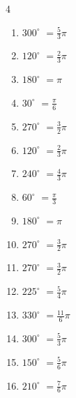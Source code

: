 \begin{multicols}{4}
\begin{enumerate}
  \itemsep=3pt
  \item $\displaystyle 300^{\circ}$
        $\displaystyle =\frac{5}{3}\pi$

  \item $\displaystyle 120^{\circ}$
        $\displaystyle =\frac{2}{3}\pi$

  \item $\displaystyle 180^{\circ}$
        $\displaystyle =\pi$

  \item $\displaystyle 30^{\circ}$
        $\displaystyle =\frac{\pi}{6}$

  \item $\displaystyle 270^{\circ}$
        $\displaystyle =\frac{3}{2}\pi$

  \item $\displaystyle 120^{\circ}$
        $\displaystyle =\frac{2}{3}\pi$

  \item $\displaystyle 240^{\circ}$
        $\displaystyle =\frac{4}{3}\pi$

  \item $\displaystyle 60^{\circ}$
        $\displaystyle =\frac{\pi}{3}$

  \item $\displaystyle 180^{\circ}$
        $\displaystyle =\pi$

  \item $\displaystyle 270^{\circ}$
        $\displaystyle =\frac{3}{2}\pi$

  \item $\displaystyle 270^{\circ}$
        $\displaystyle =\frac{3}{2}\pi$

  \item $\displaystyle 225^{\circ}$
        $\displaystyle =\frac{5}{4}\pi$

  \item $\displaystyle 330^{\circ}$
        $\displaystyle =\frac{11}{6}\pi$

  \item $\displaystyle 300^{\circ}$
        $\displaystyle =\frac{5}{3}\pi$

  \item $\displaystyle 150^{\circ}$
        $\displaystyle =\frac{5}{6}\pi$

  \item $\displaystyle 210^{\circ}$
        $\displaystyle =\frac{7}{6}\pi$


\end{enumerate}
\end{multicols}
